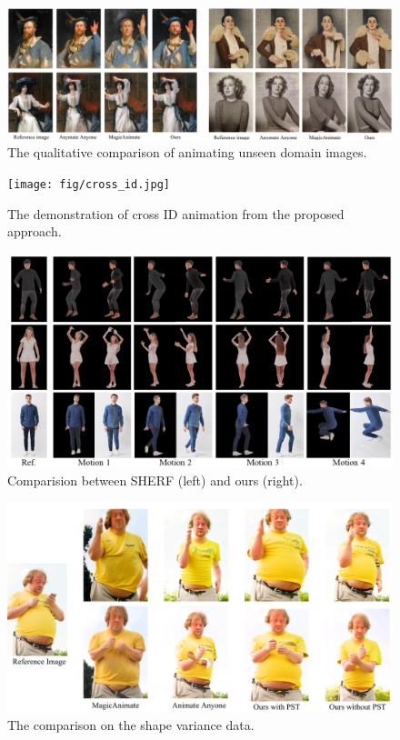 \begin{figure}[!t]
  \centering
  \includegraphics[width=1.0\linewidth]{fig/unseen.jpg}
  \caption{The qualitative comparison of animating unseen domain images.}
  \label{fig:unseen_data}
\end{figure}

\begin{figure}[!t]
  \centering
  \texttt{[image: fig/cross\_id.jpg]}
  \caption{The demonstration of cross ID animation from the proposed approach.}
  \vspace{-4mm}
  \label{fig:cross_id}
\end{figure}

\begin{figure}[!t]
  \centering
  \includegraphics[width=1.0\linewidth]{fig/comp_sherf.png}
  \caption{Comparision between SHERF (left) and ours (right).}
  \vspace{-4mm}
  \label{fig:comp_sherf}
\end{figure}

\begin{figure}[!t]
  \centering
  \includegraphics[width=0.8\linewidth]{fig/shape_variance.jpg}
  \caption{The comparison on the shape variance data.}
  \label{fig:shape_variance}
\vspace{-4mm}  
\end{figure}



